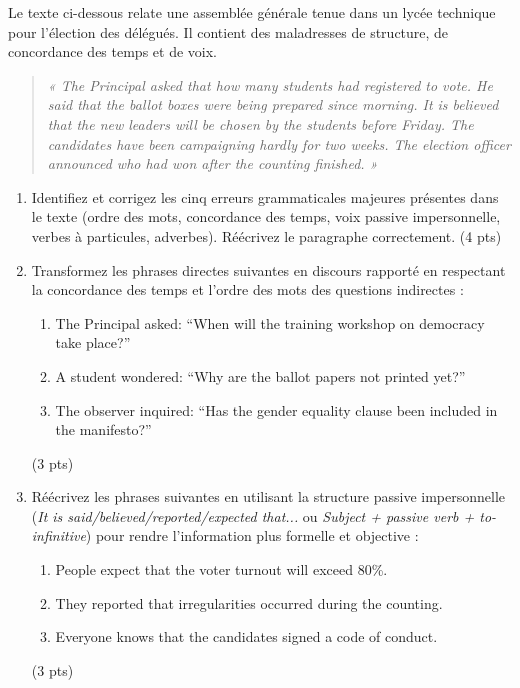 \documentclass[11pt]{article}
\begin{document}
\begin{exercice}
Le texte ci-dessous relate une assemblée générale tenue dans un lycée technique pour l'élection des délégués. Il contient des maladresses de structure, de concordance des temps et de voix.

\begin{quote}
\textit{« The Principal asked that how many students had registered to vote. He said that the ballot boxes were being prepared since morning. It is believed that the new leaders will be chosen by the students before Friday. The candidates have been campaigning hardly for two weeks. The election officer announced who had won after the counting finished. »}
\end{quote}

\begin{enumerate}
    \item Identifiez et corrigez les cinq erreurs grammaticales majeures présentes dans le texte (ordre des mots, concordance des temps, voix passive impersonnelle, verbes à particules, adverbes). Réécrivez le paragraphe correctement. (4 pts)
    \item Transformez les phrases directes suivantes en discours rapporté en respectant la concordance des temps et l'ordre des mots des questions indirectes :
    \begin{enumerate}
        \item The Principal asked: ``When will the training workshop on democracy take place?''
        \item A student wondered: ``Why are the ballot papers not printed yet?''
        \item The observer inquired: ``Has the gender equality clause been included in the manifesto?''
    \end{enumerate} (3 pts)
    \item Réécrivez les phrases suivantes en utilisant la structure passive impersonnelle (\textit{It is said/believed/reported/expected that...} ou \textit{Subject + passive verb + to-infinitive}) pour rendre l'information plus formelle et objective :
    \begin{enumerate}
        \item People expect that the voter turnout will exceed 80\%.
        \item They reported that irregularities occurred during the counting.
        \item Everyone knows that the candidates signed a code of conduct.
    \end{enumerate} (3 pts)
\end{enumerate}
\end{exercice}
\end{document}
